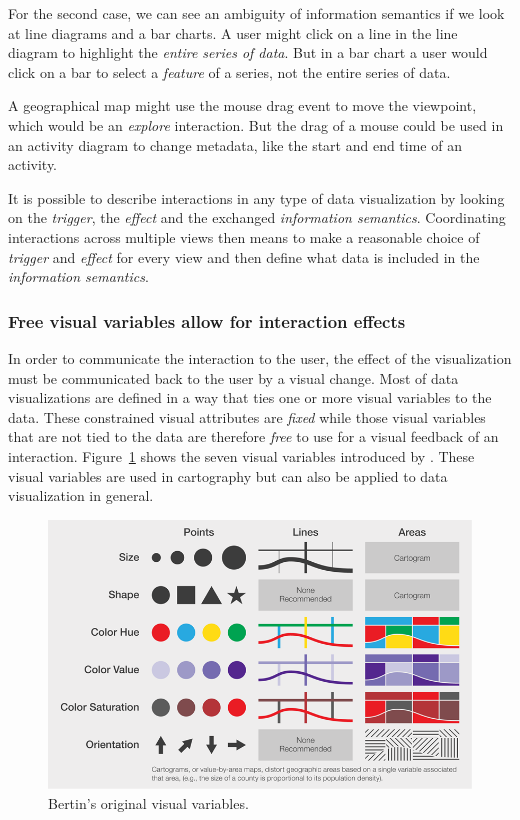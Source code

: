 \documentclass{article}
\begin{document}
For the second case, we can see an ambiguity of information semantics if we look at line diagrams and a bar charts.
A user might click on a line in the line diagram to highlight the \emph{entire series of data}.
But in a bar chart a user would click on a bar to select a \emph{feature} of a series, not the entire series of data.

A geographical map might use the mouse drag event to move the viewpoint, which would be an \emph{explore} interaction.
But the drag of a mouse could be used in an activity diagram to change metadata, like the start and end time of an activity.

It is possible to describe interactions in any type of data visualization by looking on the \emph{trigger}, the \emph{effect} and the exchanged \emph{information semantics}.
Coordinating interactions across multiple views then means to make a reasonable choice of \emph{trigger} and \emph{effect} for every view and then define what data is included in the \emph{information semantics}.


\subsubsection{Free visual variables allow for interaction effects}

In order to communicate the interaction to the user, the effect of the visualization must be communicated back to the user by a visual change.
Most of data visualizations are defined in a way that ties one or more visual variables to the data.
These constrained visual attributes are \emph{fixed} while those visual variables that are not tied to the data are therefore \emph{free} to use for a visual feedback of an interaction.
Figure~\ref{fig:concept:visual-variables} shows the seven visual variables introduced by \textcite{Bertin2010}.
These visual variables are used in cartography but can also be applied to data visualization in general.
\begin{figure}[h!]
  \centering
  \includegraphics[width=\textwidth]{images/visual-variables.png}
  \caption{Bertin's\cite{Bertin2010} original visual variables.}
  \label{fig:concept:visual-variables}
\end{figure}
\end{document}
